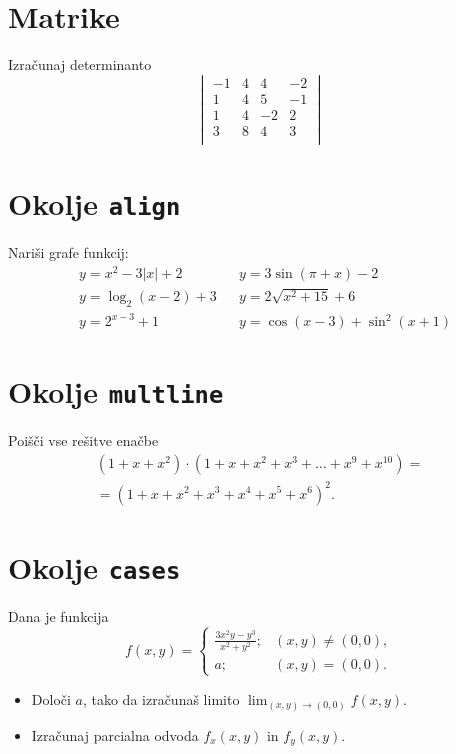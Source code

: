 \documentclass[a4paper,12pt]{article}
\begin{document}
\section*{Matrike}
Izračunaj determinanto
\[\begin{vmatrix}   
   -1 & 4 & 4 & -2 \\
   1 & 4 & 5 & -1 \\
   1 & 4 & -2 & 2 \\
   3 & 8 & 4 & 3 \\
\end{vmatrix}
\]

\section*{Okolje \texttt{align}}
Nariši grafe funkcij:
\begin{align*}
&y = x^2 - 3|x| + 2    &&y = 3 \sin(\pi+x) - 2 \\
&y = \log_2(x-2) + 3   &&y = 2 \sqrt{x^2+15} + 6 \\
&y = 2^{x-3} + 1       &&y = \cos(x-3) + \sin^2(x+1)   
\end{align*}

\section*{Okolje \texttt{multline}}
Poišči vse rešitve enačbe
\begin{multline*}
(1+x+x^2) \cdot (1+x+x^2+x^3+\ldots+x^9+x^{10}) = \\
=(1+x+x^2+x^3+x^4+x^5+x^6)^2.   
\end{multline*}

\section*{Okolje \texttt{cases}}
Dana je funkcija
\[
f(x, y) = \begin{cases}
   \frac{3x^2y-y^3}{x^2+y^2}; & (x, y) \not = (0, 0), \\
   a; & (x, y) = (0, 0).
\end{cases}
\]
\begin{itemize}
\item Določi \(a\), tako da izračunaš limito \( \lim_{(x,y)\to(0,0)} f(x,y) \).
\item Izračunaj parcialna odvoda \(f_x(x,y)\) in \(f_y(x,y)\).
\end{itemize}
\end{document}

